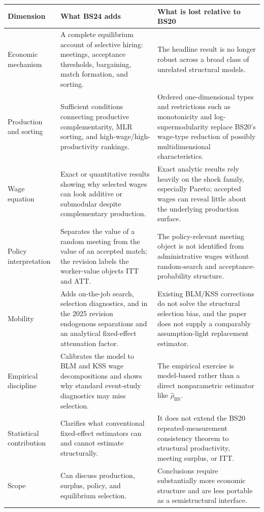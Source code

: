 \documentclass[11pt]{article}
\begin{document}
\begin{longtable}{p{}p{}p{}}
\textbf{Dimension} & \textbf{What BS24 adds} & \textbf{What is lost relative
to BS20} \\
\hline
Economic mechanism & A complete equilibrium account of selective hiring:
meetings, acceptance thresholds, bargaining, match formation, and sorting. &
The headline result is no longer robust across a broad class of unrelated
structural models. \\
Production and sorting & Sufficient conditions connecting productive
complementarity, MLR sorting, and high-wage/high-productivity rankings. &
Ordered one-dimensional types and restrictions such as monotonicity and
log-supermodularity replace BS20's wage-type reduction of possibly
multidimensional characteristics. \\
Wage equation & Exact or quantitative results showing why selected wages can
look additive or submodular despite complementary production. & Exact analytic
results rely heavily on the shock family, especially Pareto; accepted wages
can reveal little about the underlying production surface. \\
Policy interpretation & Separates the value of a random meeting from the value
of an accepted match; the revision labels the worker-value objects ITT and ATT.
& The policy-relevant meeting object is not identified from administrative
wages without random-search and acceptance-probability structure. \\
Mobility & Adds on-the-job search, selection diagnostics, and in the 2025
revision endogenous separations and an analytical fixed-effect attenuation
factor. & Existing BLM/KSS corrections do not solve the structural selection
bias, and the paper does not supply a comparably assumption-light replacement
estimator. \\
Empirical discipline & Calibrates the model to BLM and KSS wage decompositions
and shows why standard event-study diagnostics may miss selection. & The
empirical exercise is model-based rather than a direct nonparametric estimator
like \(\widehat\rho_{\mathrm{BS}}\). \\
Statistical contribution & Clarifies what conventional fixed-effect
estimators can and cannot estimate structurally. & It does not extend the
BS20 repeated-measurement consistency theorem to structural productivity,
meeting surplus, or ITT. \\
Scope & Can discuss production, surplus, policy, and equilibrium selection. &
Conclusions require substantially more economic structure and are less
portable as a semistructural interface. \\
\end{longtable}
\end{document}
